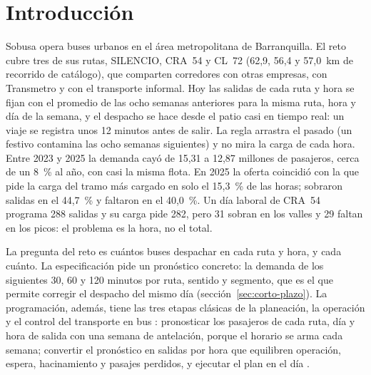 \section{Introducción}
\label{sec:introduccion}

Sobusa opera buses urbanos en el área metropolitana de Barranquilla. El reto cubre tres de sus rutas,
SILENCIO, CRA~54 y CL~72 (62,9, 56,4 y 57,0~km de recorrido de catálogo), que comparten corredores con otras
empresas, con Transmetro y con el transporte informal. Hoy las salidas de cada ruta y hora se fijan con el
promedio de las ocho semanas anteriores para la misma ruta, hora y día de la semana, y el despacho se hace
desde el patio casi en tiempo real: un viaje se registra unos 12 minutos antes de salir. La regla arrastra el
pasado (un festivo contamina las ocho semanas siguientes) y no mira la carga de cada hora. Entre 2023 y 2025 la
demanda cayó de 15,31 a 12,87 millones de pasajeros, cerca de un 8~\% al año, con casi la misma flota. En 2025
la oferta coincidió con la que pide la carga del tramo más cargado en solo el 15,3~\% de las horas; sobraron
salidas en el 44,7~\% y faltaron en el 40,0~\%. Un día laboral de CRA~54 programa 288 salidas y su carga pide
282, pero 31 sobran en los valles y 29 faltan en los picos: el problema es la hora, no el total.

La pregunta del reto es cuántos buses despachar en cada ruta y hora, y cada cuánto. La especificación pide un
pronóstico concreto: la demanda de los siguientes 30, 60 y 120 minutos por ruta, sentido y segmento, que es el que
permite corregir el despacho del mismo día (sección~\ref{sec:corto-plazo}). La programación, además, tiene las tres
etapas clásicas de la planeación, la operación y el control del transporte en bus \citep{ibarra2015review}:
pronosticar los pasajeros de cada ruta, día y hora de salida con una semana de antelación, porque el horario se
arma cada semana; convertir el pronóstico en salidas por hora \citep{ceder1984frequency,ceder2016transit} que
equilibren operación, espera, hacinamiento y pasajes perdidos, y ejecutar el plan en el día \citep{daganzo2009bunching}.

